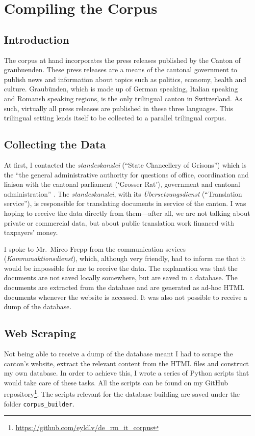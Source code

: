\chapter{Compiling the Corpus}
\label{chap:compiling}
\section{Introduction}

The corpus at hand incorporates the press releases published by the Canton of \Gls{graubuenden}. 
These press releases are a means of the cantonal government to publish news and information about topics such as politics, economy, health and culture. 
Graubünden, which is made up of German speaking, Italian speaking and Romansh speaking regions, is the only trilingual canton in Switzerland. 
As such, virtually all press releases are published in these three languages.
This trilingual setting lends itself to be collected to a parallel trilingual corpus.

\section{Collecting the Data}
At first, I contacted the \emph{\Gls{standeskanzlei}} (\enquote{State Chancellery of Grisons}) which is the \enquote{the general administrative authority for questions of office, coordination and liaison with the cantonal parliament (\enquote{Grosser Rat}), government and cantonal administration} \autocite{staka}. 
The \emph{\Gls{standeskanzlei}}, with its \emph{Übersetzungsdienst} (\enquote{Translation service}), is responsible for translating documents in service of the canton.
I was hoping to receive the data directly from them---after all, we are not talking about private or commercial data, but about public translation work financed with taxpayers' money.

I spoke to Mr.~Mirco Frepp from the communication sevices (\emph{Kommunaktionsdienst}), which, although very friendly, had to inform me that it would be impossible for me to receive the data. 
The explanation was that the documents are not saved locally somewhere, but are saved in a database. 
The documents are extracted from the database and are generated as ad-hoc HTML documents whenever the website is accessed. 
It was also not possible to receive a dump of the database.

\section{Web Scraping}
Not being able to receive a dump of the database meant I had to scrape the canton's website, extract the relevant content from the HTML files and construct my own database. In order to achieve this, I wrote a series of Python scripts that would take care of these tasks. 
All the scripts can be found on my GitHub repository\footnote{\url{https://github.com/eyldlv/de_rm_it_corpus}}. 
The scripts relevant for the database building are saved under the folder \texttt{corpus\_builder}.

